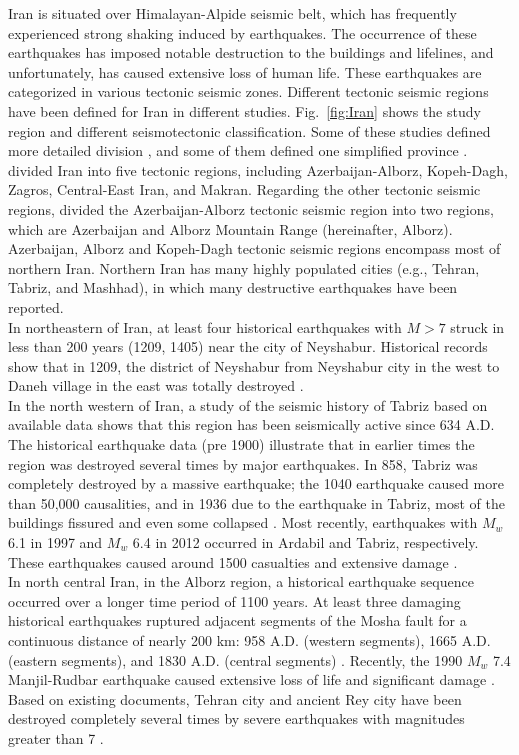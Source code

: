 \documentclass{article}
\begin{document}
Iran is situated over Himalayan-Alpide seismic belt, which has frequently experienced strong shaking induced by earthquakes. The occurrence of these earthquakes has imposed notable destruction to the buildings and lifelines, and unfortunately, has caused extensive loss of human life. These earthquakes are categorized in various tectonic seismic zones. Different tectonic seismic regions have been defined for Iran in different studies.  Fig.~\ref{fig:Iran} shows the study region and different seismotectonic classification. Some of these studies defined more detailed division \citep{Nowroozi1976, Tavakoli1999}, and some of them defined one simplified province \citep{Stocklin1968, Takin1972, Berberian1976}. \citet{Mirzaei1998} divided Iran into five tectonic regions, including Azerbaijan-Alborz, Kopeh-Dagh, Zagros, Central-East Iran, and Makran. Regarding the other tectonic seismic regions, \citet{Karimiparidari2013} divided the Azerbaijan-Alborz tectonic seismic region into two regions, which are Azerbaijan and Alborz Mountain Range (hereinafter, Alborz). Azerbaijan, Alborz and Kopeh-Dagh tectonic seismic regions encompass most of northern Iran. Northern Iran has many highly populated cities (e.g., Tehran, Tabriz, and Mashhad), in which many destructive earthquakes have been reported.\\
\noindent
In northeastern of Iran, at least four historical earthquakes with $M>7$ struck in less than 200 years (1209, 1405) near the city of Neyshabur. Historical records show that in 1209, the district of Neyshabur from Neyshabur city in the west to Daneh village in the east was totally destroyed \citep{Berberian1999}.\\
\noindent
In the north western of Iran, a study of the seismic history of Tabriz based on available data shows that this region has been seismically active since 634 A.D. The historical earthquake data (pre 1900) illustrate that in earlier times the region was destroyed several times by major earthquakes. In 858, Tabriz was completely destroyed by a massive earthquake; the 1040 earthquake caused more than 50,000 causalities, and in 1936 due to the earthquake in Tabriz, most of the buildings fissured and even some collapsed \citep{Berberian1999}. Most recently, earthquakes with $M_w$ 6.1 in 1997 and $M_w$ 6.4 in 2012 occurred in Ardabil and Tabriz, respectively. These earthquakes caused around 1500 casualties and extensive damage \citep{USGS_ardabil,USGS_tabriz}.\\
\noindent
In north central Iran, in the Alborz region, a historical earthquake sequence occurred over a longer time period of 1100 years. At least three damaging historical earthquakes ruptured adjacent segments of the Mosha fault for a continuous distance of nearly 200 km: 958 A.D. (western segments), 1665 A.D. (eastern segments), and 1830 A.D. (central segments) \cite{Berberian1999}. Recently, the 1990 $M_w$ 7.4 Manjil-Rudbar earthquake caused extensive loss of life and significant damage \citep{USGS_manjil}. Based on existing documents, Tehran city and ancient Rey city have been destroyed completely several times by severe earthquakes with magnitudes greater than 7 \citep{Ambraseys2005}. \\
\end{document}
